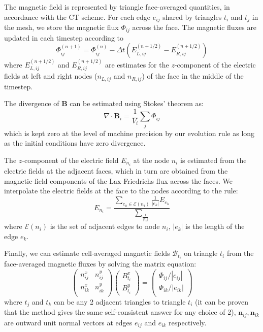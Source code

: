 \documentclass[12pt]{article}
\begin{document}
The magnetic field is represented by triangle face-averaged quantities, in accordance with the CT scheme. For each edge $e_{ij}$ shared by triangles $t_i$ and $t_j$ in the mesh, we store the magnetic flux $\Phi_{ij}$ across the face. The magnetic fluxes are updated in each timestep according to 
\begin{equation}
\Phi_{ij}^{(n+1)} = \Phi_{ij}^{(n)} - \Delta t (E^{(n+1/2)}_{L,ij} - E^{(n+1/2)}_{R,ij})
\label{eqn:evo6}
\end{equation}
where $E^{(n+1/2)}_{L,ij}$ and $E^{(n+1/2)}_{R,ij}$ are estimates for the $z$-component of the electric fields at left and right nodes ($n_{L,ij}$ and $n_{R,ij}$) of the face in the middle of the timestep. 

The divergence of $\mathbf{B}$ can be estimated using Stokes' theorem as:
\begin{equation}
\nabla\cdot \mathbf{B}_i = \frac{1}{V_i}\sum_j \Phi_{ij} 
\label{eqn:div}
\end{equation}
which is kept zero at the level of machine precision by our evolution rule as long as the initial conditions have zero divergence.

The $z$-component of the electric field $E_{n_i}$ at the node $n_i$ is estimated from the electric fields at the adjacent faces, which in turn are obtained from the magnetic-field components of the Lax-Friedrichs flux across the faces. We interpolate the electric fields at the face to the nodes according to the rule:
\begin{equation}
  E_{n_i} =  \frac{\sum_{e_k\in\mathcal{E}(n_i)}  \frac{1}{|e_k|}E_{e_k} }{\sum_{\frac{1}{|e_k|}}}
\end{equation}
where $\mathcal{E}(n_i)$ is the set of adjacent edges to node $n_i$, $|e_k|$ is the length of the edge $e_k$.

Finally, we can estimate cell-averaged magnetic fields $\mathcal{B}_{t_i}$ on triangle $t_i$ from the face-averaged magnetic fluxes by solving the matrix equation:
\begin{equation}
\begin{pmatrix} 
n^x_{ij} & n^y_{ij} \\
n^x_{ik} & n^y_{ik} \\
\end{pmatrix}
\begin{pmatrix} 
B^x_{t_i}\\
B^y_{t_i}
\end{pmatrix}
=
\begin{pmatrix} 
\Phi_{ij}/|e_{ij}| \\
\Phi_{ik}/|e_{ik}| \\
\end{pmatrix}
\end{equation}
where $t_j$ and $t_k$ can be any 2 adjacent triangles to triangle $t_i$ (it can be proven that the method gives the same self-consistent answer for any choice of 2), $\mathbf{n}_{ij}, \mathbf{n}_{ik}$ are outward unit normal vectors at edges $e_{ij}$ and $e_{ik}$ respectively.
\end{document}
